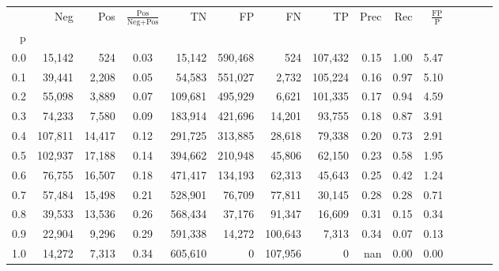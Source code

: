 \begin{tabular}{rrrcrrrrrrrrrrr}
\toprule
{} &      Neg &     Pos & $\frac{\text{Pos}}{\text{Neg}+\text{Pos}}$ &       TN &       FP &       FN &       TP &  Prec &   Rec & $\frac{\text{FP}}{\text{P}}$ \\
p   &          &         &                                            &          &          &          &          &       &       &                              \\
\midrule
0.0 &   15,142 &     524 &                                       0.03 &   15,142 &  590,468 &      524 &  107,432 &  0.15 &  1.00 &                         5.47 \\
0.1 &   39,441 &   2,208 &                                       0.05 &   54,583 &  551,027 &    2,732 &  105,224 &  0.16 &  0.97 &                         5.10 \\
0.2 &   55,098 &   3,889 &                                       0.07 &  109,681 &  495,929 &    6,621 &  101,335 &  0.17 &  0.94 &                         4.59 \\
0.3 &   74,233 &   7,580 &                                       0.09 &  183,914 &  421,696 &   14,201 &   93,755 &  0.18 &  0.87 &                         3.91 \\
0.4 &  107,811 &  14,417 &                                       0.12 &  291,725 &  313,885 &   28,618 &   79,338 &  0.20 &  0.73 &                         2.91 \\
0.5 &  102,937 &  17,188 &                                       0.14 &  394,662 &  210,948 &   45,806 &   62,150 &  0.23 &  0.58 &                         1.95 \\
0.6 &   76,755 &  16,507 &                                       0.18 &  471,417 &  134,193 &   62,313 &   45,643 &  0.25 &  0.42 &                         1.24 \\
0.7 &   57,484 &  15,498 &                                       0.21 &  528,901 &   76,709 &   77,811 &   30,145 &  0.28 &  0.28 &                         0.71 \\
0.8 &   39,533 &  13,536 &                                       0.26 &  568,434 &   37,176 &   91,347 &   16,609 &  0.31 &  0.15 &                         0.34 \\
0.9 &   22,904 &   9,296 &                                       0.29 &  591,338 &   14,272 &  100,643 &    7,313 &  0.34 &  0.07 &                         0.13 \\
1.0 &   14,272 &   7,313 &                                       0.34 &  605,610 &        0 &  107,956 &        0 &   nan &  0.00 &                         0.00 \\
\bottomrule
\end{tabular}
